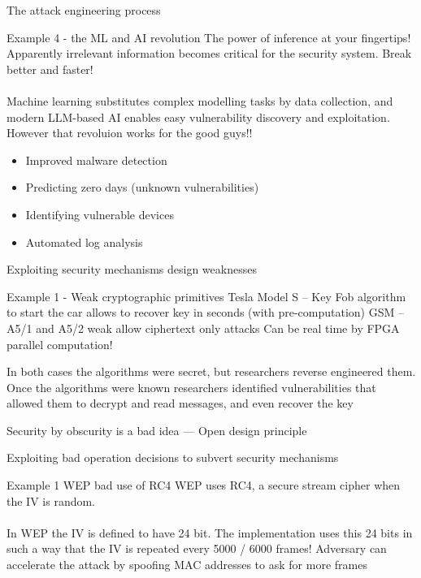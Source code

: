 \begin{parag}{The attack engineering process}
	\begin{subparag}{Example 4 - the ML and AI revolution}
	    The power of inference at your fingertips! Apparently irrelevant information becomes critical for the security system. Break better and faster!\\
		$ $\\
		Machine learning substitutes complex modelling tasks by data collection, and modern LLM-based AI enables easy vulnerability discovery and exploitation. However that revoluion  works for the good guys!!
		\begin{itemize}
		    \item Improved malware detection
		    \item Predicting zero days (unknown vulnerabilities)
		    \item Identifying vulnerable devices
		    \item Automated log analysis
		\end{itemize}
		
	\end{subparag}
\end{parag}


\begin{parag}{Exploiting security mechanisms design weaknesses}
    \begin{subparag}{Example 1 - Weak cryptographic primitives}
        Tesla Model S – Key Fob algorithm to start the car allows to recover key in seconds (with pre-computation) GSM – A5/1 and A5/2 weak allow ciphertext only attacks Can be real time by FPGA parallel computation!
    \end{subparag}
	In both cases the algorithms were secret, but researchers reverse engineered them. Once the algorithms were known researchers identified vulnerabilities that allowed them to decrypt and read messages, and even recover the key
	\begin{center}
	    Security by obscurity is a bad idea --- Open design principle
	\end{center}
	
\end{parag}



\begin{parag}{Exploiting bad operation decisions to subvert security mechanisms}
    
	\begin{subparag}{Example 1 WEP bad use of RC4}
	   WEP uses RC4, a secure stream cipher when the IV is random. \\
	   $ $\\
	   In WEP the IV is defined to have 24 bit. The implementation uses this 24 bits in such a way that the IV is repeated every 5000 / 6000 frames! Adversary can accelerate the attack by spoofing MAC addresses to ask for more frames 
	\end{subparag}
\end{parag}


